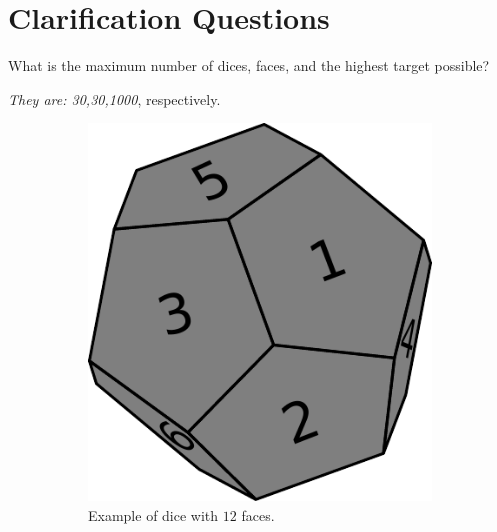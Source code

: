 \section{Clarification Questions}

\begin{QandA}
	\item What is the maximum number of dices, faces, and the highest target possible?
	\begin{answered}
		\textit{They are: 30,30,1000}, respectively.
	\end{answered}
	
\end{QandA}

\begin{figure}
	\centering
	\begin{subfigure}[t]{0.25\textwidth}
		\includegraphics[width=1\linewidth]{sources/dice_rolls/images/3d_dices}
		\caption{Example of dice with $12$ faces.}
		\label{fig:dice_rolls:12faces_dice}
	 \end{subfigure}
	\hfill
	\begin{subfigure}[t]{0.25\textwidth}

\end{subfigure}
\end{figure}
